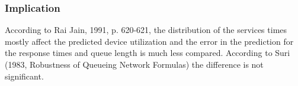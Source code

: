 \documentclass[a4paper, 11pt]{article}
\begin{document}
	\subsubsection{Implication}
	According to Rai Jain, 1991, p. 620-621, the distribution of the services times mostly affect the predicted device utilization and the error in the prediction for the response times and queue length is much less compared. According to Suri (1983, Robustness of Queueing Network Formulas) the difference is not significant.
\end{document}
